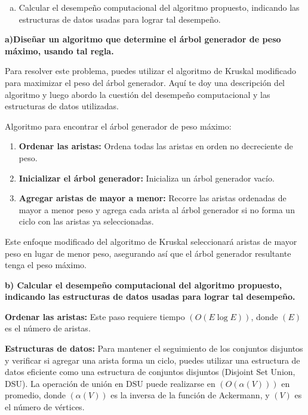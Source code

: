 \documentclass[answers, 11pt]{exam}
\begin{document}
\begin{questions}
{\begin{enumerate}[a)]
    \item Calcular el desempeño computacional del algoritmo propuesto, indicando 
    las estructuras de datos usadas para lograr tal desempeño.
  \end{enumerate}}

  \begin{solution}
    \textbf{a)Diseñar un algoritmo que determine el árbol generador de peso
    máximo, usando tal regla.}

    Para resolver este problema, puedes utilizar el algoritmo de Kruskal modificado 
    para maximizar el peso del árbol generador. Aquí te doy una descripción del 
    algoritmo y luego abordo la cuestión del desempeño computacional y las 
    estructuras de datos utilizadas.

    Algoritmo para encontrar el árbol generador de peso máximo:
    
    \begin{enumerate}[1.]
      \item \textbf{Ordenar las aristas:} Ordena todas las aristas en orden no decreciente de peso.
      \item \textbf{Inicializar el árbol generador:} Inicializa un árbol generador vacío.
      \item \textbf{Agregar aristas de mayor a menor:} Recorre las aristas ordenadas de mayor a menor 
      peso y agrega cada arista al árbol generador si no forma un ciclo con las aristas 
      ya seleccionadas.
    \end{enumerate}

    Este enfoque modificado del algoritmo de Kruskal seleccionará aristas de mayor 
    peso en lugar de menor peso, asegurando así que el árbol generador 
    resultante tenga el peso máximo.

    \textbf{b) Calcular el desempeño computacional del algoritmo propuesto, indicando 
    las estructuras de datos usadas para lograr tal desempeño.}

    \textbf{Ordenar las aristas:} Este paso requiere tiempo $(O(E \log E))$, 
    donde $(E)$ es el número de aristas.
  
    \textbf{Estructuras de datos:} Para mantener el seguimiento de los conjuntos 
    disjuntos y verificar si agregar una arista forma un ciclo, puedes utilizar 
    una estructura de datos eficiente como una estructura de conjuntos disjuntos 
    (Disjoint Set Union, DSU). La operación de unión en DSU puede realizarse en 
    $(O(\alpha(V)))$ en promedio, donde $(\alpha(V))$ es la inversa de la función 
    de Ackermann, y $(V)$ es el número de vértices.


\end{solution}
\end{questions}
\end{document}
